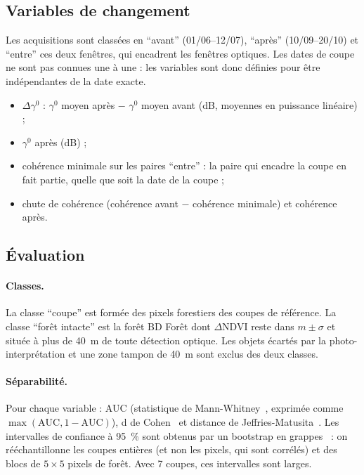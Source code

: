 \subsection{Variables de changement}

Les acquisitions sont classées en \enquote{avant} (01/06--12/07), \enquote{après} (10/09--20/10) et
\enquote{entre} ces deux fenêtres, qui encadrent les fenêtres optiques. Les dates de coupe ne sont pas connues
une à une : les variables sont donc définies pour être indépendantes de la date exacte.
\begin{itemize}
\item $\Delta\gamma^0$ : $\gamma^0$ moyen après $-$ $\gamma^0$ moyen avant (dB, moyennes en puissance linéaire) ;
\item $\gamma^0$ après (dB) ;
\item cohérence minimale sur les paires \enquote{entre} : la paire qui encadre la coupe en fait partie, quelle que
  soit la date de la coupe ;
\item chute de cohérence (cohérence avant $-$ cohérence minimale) et cohérence après.
\end{itemize}

\subsection{Évaluation}

\paragraph{Classes.} La classe \enquote{coupe} est formée des pixels forestiers des coupes de référence. La classe
\enquote{forêt intacte} est la forêt BD Forêt dont $\Delta$NDVI reste dans $m \pm \sigma$ et située à plus de 40~m
de toute détection optique. Les objets écartés par la photo-interprétation et une zone tampon de 40~m sont exclus
des deux classes.

\paragraph{Séparabilité.} Pour chaque variable : AUC (statistique de Mann-Whitney~\cite{hanley1982auc}, exprimée
comme $\max(\mathrm{AUC}, 1-\mathrm{AUC})$), d de Cohen~\cite{cohen1988power} et distance de
Jeffries-Matusita~\cite{swain1978remote}. Les intervalles de confiance à 95~\% sont obtenus par un bootstrap en
grappes~\cite{kunsch1989bootstrap} : on rééchantillonne les coupes entières (et non les pixels, qui sont
corrélés) et des blocs de $5\times5$ pixels de forêt. Avec 7 coupes, ces intervalles sont larges.

